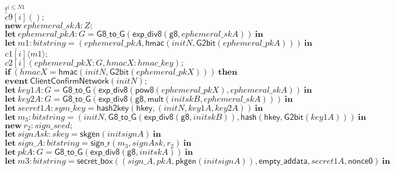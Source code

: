 \documentclass{article}
\newcommand{\cinput}[2]{{#1}({#2})}
\newcommand{\coutput}[2]{\overline{#1}\langle{#2}\rangle}
\newcommand{\kw}[1]{\mathbf{#1}}
\newcommand{\kwf}[1]{\mathsf{#1}}
\newcommand{\var}[1]{\mathit{#1}}
\newcommand{\kwt}[1]{\mathit{#1}}
\newcommand{\kwp}[1]{\mathit{#1}}
\newcommand{\kwc}[1]{\mathit{#1}}
\begin{document}
\begin{tabbing}
\>$\quad !^{\var{i} \leq \kwp{N1}}$\\
\>$\quad \cinput{\kwc{c9}[\var{i}]}{};$\\
\>$\quad \kw{new}\ \var{ephemeral{\_}skA}: \kwt{Z};$\\
\>$\quad \kw{let}\ \var{ephemeral{\_}pkA}: \kwt{G} = \kwf{G8{\_}to{\_}G}(\kwf{exp{\_}div8}(\kwf{g8}, \var{ephemeral{\_}skA}))\ \kw{in}$\\
\>$\quad \kw{let}\ \var{m1}: \kwt{bitstring} = \kwf{}(\var{ephemeral{\_}pkA}, \kwf{hmac}(\var{initN}, \kwf{G2bit}(\var{ephemeral{\_}pkA})))\ \kw{in}$\\
\>$\quad \coutput{\kwc{c1}[\var{i}]}{\var{m1}};$\\
\>$\quad \cinput{\kwc{c2}[\var{i}]}{\var{ephemeral{\_}pkX}: \kwt{G}, \var{hmacX}: \kwt{hmac{\_}key}};$\\
\>$\quad \kw{if}\ (\var{hmacX}  =  \kwf{hmac}(\var{initN}, \kwf{G2bit}(\var{ephemeral{\_}pkX})))\ \kw{then}$\\
\>$\quad \kw{event}\ \kwf{ClientConfirmNetwork}(\var{initN});$\\
\>$\quad \kw{let}\ \var{key1A}: \kwt{G} = \kwf{G8{\_}to{\_}G}(\kwf{exp{\_}div8}(\kwf{pow8}(\var{ephemeral{\_}pkX}), \var{ephemeral{\_}skA}))\ \kw{in}$\\
\>$\quad \kw{let}\ \var{key2A}: \kwt{G} = \kwf{G8{\_}to{\_}G}(\kwf{exp{\_}div8}(\kwf{g8}, \kwf{mult}(\var{initskB}, \var{ephemeral{\_}skA})))\ \kw{in}$\\
\>$\quad \kw{let}\ \var{secret1A}: \kwt{sym{\_}key} = \kwf{hash2key}(\kwf{hkey}, \kwf{}(\var{initN}, \var{key1A}, \var{key2A}))\ \kw{in}$\\
\>$\quad \kw{let}\ \var{m}_{3}: \kwt{bitstring} = \kwf{}(\var{initN}, \kwf{G8{\_}to{\_}G}(\kwf{exp{\_}div8}(\kwf{g8}, \var{initskB})), \kwf{hash}(\kwf{hkey}, \kwf{G2bit}(\var{key1A})))\ \kw{in}$\\
\>$\quad \kw{new}\ \var{r}_{2}: \kwt{sign{\_}seed};$\\
\>$\quad \kw{let}\ \var{signAsk}: \kwt{skey} = \kwf{skgen}(\var{initsignA})\ \kw{in}$\\
\>$\quad \kw{let}\ \var{sign{\_}A}: \kwt{bitstring} = \kwf{sign{\_}r}(\var{m}_{3}, \var{signAsk}, \var{r}_{2})\ \kw{in}$\\
\>$\quad \kw{let}\ \var{pkA}: \kwt{G} = \kwf{G8{\_}to{\_}G}(\kwf{exp{\_}div8}(\kwf{g8}, \var{initskA}))\ \kw{in}$\\
\>$\quad \kw{let}\ \var{m3}: \kwt{bitstring} = \kwf{secret{\_}box}(\kwf{}(\var{sign{\_}A}, \var{pkA}, \kwf{pkgen}(\var{initsignA})), \kwf{empty{\_}addata}, \var{secret1A}, \kwf{nonce0})\ \kw{in}$\\

\end{tabbing}
\end{document}
